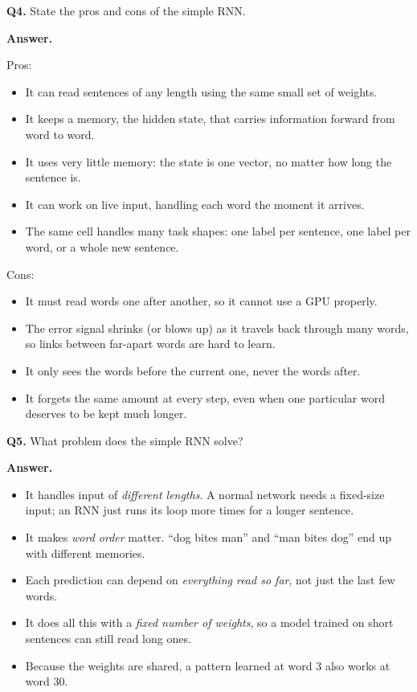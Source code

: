 \documentclass[11pt]{article}
\begin{document}
\medskip
\textbf{Q4.} State the pros and cons of the simple RNN.

\textbf{Answer.}

Pros:
\begin{itemize}
  \item It can read sentences of any length using the same small set of weights.
  \item It keeps a memory, the hidden state, that carries information forward from word to word.
  \item It uses very little memory: the state is one vector, no matter how long the sentence is.
  \item It can work on live input, handling each word the moment it arrives.
  \item The same cell handles many task shapes: one label per sentence, one label per word, or a whole new sentence.
\end{itemize}

Cons:
\begin{itemize}
  \item It must read words one after another, so it cannot use a GPU properly.
  \item The error signal shrinks (or blows up) as it travels back through many words, so links between far-apart words are hard to learn.
  \item It only sees the words before the current one, never the words after.
  \item It forgets the same amount at every step, even when one particular word deserves to be kept much longer.
\end{itemize}

\medskip
\textbf{Q5.} What problem does the simple RNN solve?

\textbf{Answer.}
\begin{itemize}
  \item It handles input of \emph{different lengths}. A normal network needs a fixed-size input; an RNN just runs its loop more times for a longer sentence.
  \item It makes \emph{word order} matter. ``dog bites man'' and ``man bites dog'' end up with different memories.
  \item Each prediction can depend on \emph{everything read so far}, not just the last few words.
  \item It does all this with a \emph{fixed number of weights}, so a model trained on short sentences can still read long ones.
  \item Because the weights are shared, a pattern learned at word 3 also works at word 30.
\end{itemize}
\end{document}
